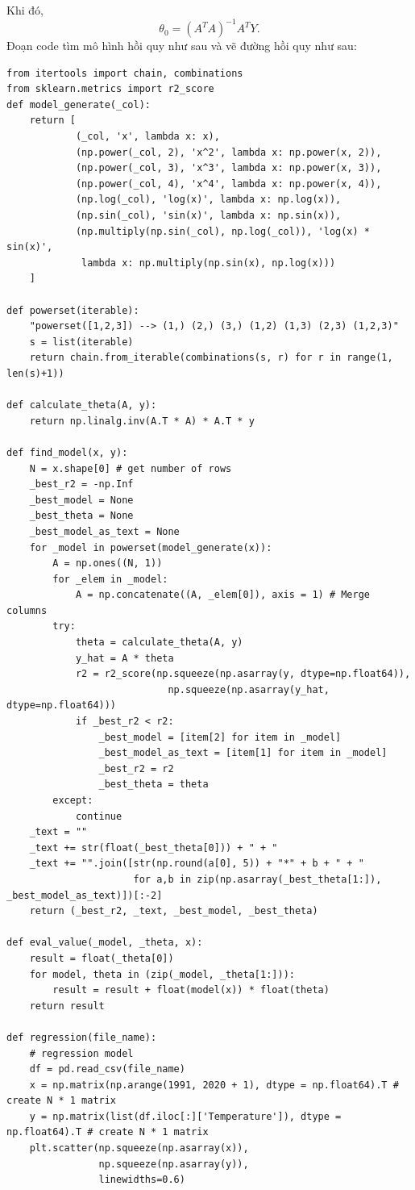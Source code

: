 \documentclass[a4paper]{article}
\begin{document}
Khi đó,
$${\theta _0} = {\left( {{A^T}A} \right)^{ - 1}}{A^T}Y.$$
Đoạn code tìm mô hình hồi quy như sau và vẽ đường hồi quy như sau:
\begin{lstlisting}
from itertools import chain, combinations
from sklearn.metrics import r2_score
def model_generate(_col):
    return [
            (_col, 'x', lambda x: x),
            (np.power(_col, 2), 'x^2', lambda x: np.power(x, 2)),
            (np.power(_col, 3), 'x^3', lambda x: np.power(x, 3)),
            (np.power(_col, 4), 'x^4', lambda x: np.power(x, 4)),
            (np.log(_col), 'log(x)', lambda x: np.log(x)),
            (np.sin(_col), 'sin(x)', lambda x: np.sin(x)),
            (np.multiply(np.sin(_col), np.log(_col)), 'log(x) * sin(x)', 
             lambda x: np.multiply(np.sin(x), np.log(x)))
    ]
    
def powerset(iterable):
    "powerset([1,2,3]) --> (1,) (2,) (3,) (1,2) (1,3) (2,3) (1,2,3)"
    s = list(iterable)
    return chain.from_iterable(combinations(s, r) for r in range(1, len(s)+1))

def calculate_theta(A, y):
    return np.linalg.inv(A.T * A) * A.T * y

def find_model(x, y):
    N = x.shape[0] # get number of rows
    _best_r2 = -np.Inf
    _best_model = None
    _best_theta = None
    _best_model_as_text = None
    for _model in powerset(model_generate(x)):
        A = np.ones((N, 1))
        for _elem in _model:
            A = np.concatenate((A, _elem[0]), axis = 1) # Merge columns
        try:
            theta = calculate_theta(A, y)
            y_hat = A * theta
            r2 = r2_score(np.squeeze(np.asarray(y, dtype=np.float64)), 
                            np.squeeze(np.asarray(y_hat, dtype=np.float64)))
            if _best_r2 < r2:
                _best_model = [item[2] for item in _model]
                _best_model_as_text = [item[1] for item in _model]
                _best_r2 = r2
                _best_theta = theta
        except:
            continue
    _text = ""
    _text += str(float(_best_theta[0])) + " + " 
    _text += "".join([str(np.round(a[0], 5)) + "*" + b + " + " 
                      for a,b in zip(np.asarray(_best_theta[1:]), _best_model_as_text)])[:-2]
    return (_best_r2, _text, _best_model, _best_theta)

def eval_value(_model, _theta, x):
    result = float(_theta[0])
    for model, theta in (zip(_model, _theta[1:])):
        result = result + float(model(x)) * float(theta)
    return result

def regression(file_name):
    # regression model
    df = pd.read_csv(file_name)
    x = np.matrix(np.arange(1991, 2020 + 1), dtype = np.float64).T # create N * 1 matrix
    y = np.matrix(list(df.iloc[:]['Temperature']), dtype = np.float64).T # create N * 1 matrix
    plt.scatter(np.squeeze(np.asarray(x)), 
                np.squeeze(np.asarray(y)), 
                linewidths=0.6)
    

\end{lstlisting}
\end{document}
